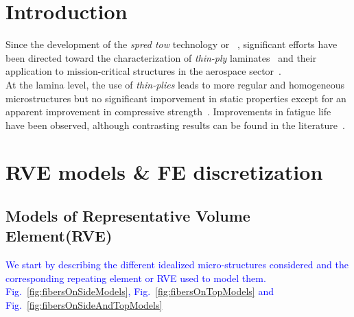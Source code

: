 \documentclass[review]{elsarticle}
\begin{document}
\linenumbers

\section{Introduction}

Since the development of the \emph{spred tow} technology or ~\cite{Kawabe2008,Kawabe2008en}, significant efforts have been directed toward the characterization of \emph{thin-ply} laminates~\cite{Sasayama2003,Yamaguchi2005,Tsai2005,Sihn2007,Yokozeki2008,Yokozeki2010,Saito2012,Arteiro2013,Arteiro2014,Amacher2014,Guillamet2014,Huang2018,Cugnoni2018} and their application to mission-critical structures in the aerospace sector~\cite{Moon2011,Kim2017,Kopp2017,McCarville2018}.\\
At the lamina level, the use of \emph{thin-plies} leads to more regular and homogeneous microstructures but no significant imporvement in static properties except for an apparent improvement in compressive strength~\cite{Amacher2014}. Improvements in fatigue life have been observed, although contrasting results can be found in the literature~\cite{Yamaguchi2005,Tsai2005,Sihn2007}.


\section{RVE models \& FE discretization}

\subsection{Models of Representative Volume Element(RVE)}

\textcolor{blue}{We start by describing the different idealized micro-structures considered and the corresponding repeating element or RVE used to model them. Fig.~\ref{fig:fibersOnSideModels}, Fig.~\ref{fig:fibersOnTopModels} and Fig.~\ref{fig:fibersOnSideAndTopModels}}
\end{document}
